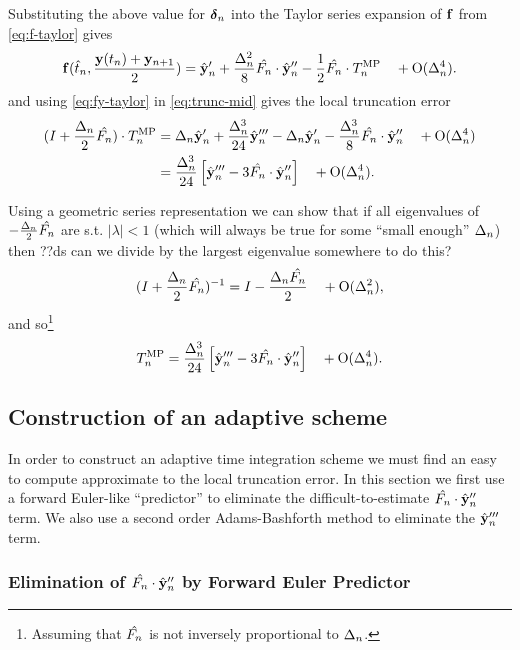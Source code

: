 Substituting the above value for $\mbox{\boldmath$\delta$}_{n}$ into the Taylor series expansion of ${\mathbf{f}}$ from \eqref{eq:f-taylor} gives
\begin{equation}
  {\mathbf{f}}(\hat{t}_{n}, \frac{\mathbf{y}(t_n) + \mathbf{y}_{n+1}}{2}) = \hat{\mathbf{y}}_{n}'
  + \frac{\Delta_{n}^2}{8} \hat{F_{n}} \cdot \hat{\mathbf{y}}_{n}'' - \frac{1}{2} \hat{F_{n}} \cdot T_n^{\text{MP}} \quad + \text{O}(\Delta_{n}^4)
  . \label{eq:fy-taylor}
\end{equation}
and using \eqref{eq:fy-taylor} in \eqref{eq:trunc-mid} gives the local truncation error
\begin{align}
  (I + \frac{\Delta_{n}}{2}\hat{F_{n}}) \cdot T_n^{\text{MP}}
  &= \Delta_{n} \hat{\mathbf{y}}_{n}' + \frac{\Delta_{n}^3}{24} \hat{\mathbf{y}}_{n}'''
  - \Delta_{n} \hat{\mathbf{y}}_{n}'
  - \frac{\Delta_{n}^3}{8} \hat{F_{n}} \cdot \hat{\mathbf{y}}_{n}'' \quad + \text{O}(\Delta_{n}^4)
  \notag \\
  &= \frac{\Delta_{n}^3}{24} \left[\hat{\mathbf{y}}_{n}''' - 3 \hat{F_{n}} \cdot \hat{\mathbf{y}}_{n}'' \right]
  \quad + \text{O}(\Delta_{n}^4).
  \label{eq:trunc-implicit-form}
\end{align}

Using a geometric series representation we can show that if all eigenvalues of  $-\frac{\Delta_{n}}{2}\hat{F_{n}}$ are s.t. $|\lambda| < 1$\cite{??ds} (which will always be true for some ``small enough'' $\Delta_{n}$) then
??ds can we divide by the largest eigenvalue somewhere to do this?
\begin{equation}
  (I + \frac{\Delta_{n}}{2}\hat{F_{n}})^{-1} = I - \frac{\Delta_{n} \hat{F_{n}}}{2}  \quad + \text{O}(\Delta_{n}^2),
\end{equation}
and so\footnote{Assuming that $\hat{F_{n}}$ is not inversely proportional to $\Delta_{n}$.}
\begin{equation}
   T_n^{\text{MP}} = \frac{\Delta_{n}^3}{24} \left[\hat{\mathbf{y}}_{n}''' - 3 \hat{F_{n}} \cdot \hat{\mathbf{y}}_{n}'' \right]
   \quad +\text{O}(\Delta_{n}^4).
  \label{eq:trunc-final}
\end{equation}

\subsection{Construction of an adaptive scheme}

In order to construct an adaptive time integration scheme we must find an easy to compute approximate to the local truncation error.
In this section we first use a forward Euler-like ``predictor'' to eliminate the difficult-to-estimate $ \hat{F_{n}} \cdot \hat{\mathbf{y}}_{n}''$ term. We also use a second order Adams-Bashforth method to eliminate the  $\hat{\mathbf{y}}_{n}'''$ term.\cite[p.707]{Gresho-Sani}



\subsubsection{Elimination of $ \hat{F_{n}} \cdot \hat{\mathbf{y}}_{n}''$ by Forward Euler Predictor}

